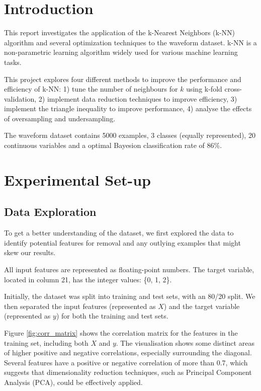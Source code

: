 \documentclass{article}
\theoremstyle{plain}
\theoremstyle{definition}
\theoremstyle{remark}
\begin{document}
\section{Introduction}
    This report investigates the application of the k-Nearest Neighbors (k-NN) algorithm and several optimization techniques to the waveform dataset. k-NN is a non-parametric learning algorithm widely used for various machine learning tasks.

    This project explores four different methods to improve the performance and efficiency of k-NN: 1) tune the number of neighbours for $k$ using k-fold cross-validation, 2) implement data reduction techniques to improve efficiency, 3) implement the triangle inequality to improve performance, 4) analyse the effects of oversampling and undersampling.

    The waveform dataset contains 5000 examples, 3 classes (equally represented), 20 continuous variables and a optimal Bayesion classification rate of 86\%.


\section{Experimental Set-up}
    \subsection{Data Exploration}
        To get a better understanding of the dataset, we first explored the data to identify potential features for removal and any outlying examples that might skew our results.

        All input features are represented as floating-point numbers. The target variable, located in column 21, has the integer values: \{0, 1, 2\}.

        Initially, the dataset was split into training and test sets, with an 80/20 split. We then separated the input features (represented as $X$) and the target variable (represented as $y$) for both the training and test sets.


        Figure \ref{fig:corr_matrix} shows the correlation matrix for the features in the training set, including both $X$ and $y$. The visualisation shows some distinct areas of higher positive and negative correlations, especially surrounding the diagonal. Several features have a positive or negative correlation of more than 0.7, which suggests that dimensionality reduction techniques, such as Principal Component Analysis (PCA), could be effectively applied.
\end{document}
